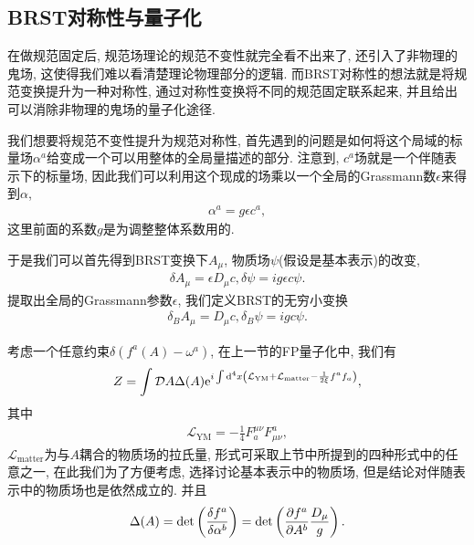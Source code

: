 \subsection{BRST对称性与量子化}
在做规范固定后, 规范场理论的规范不变性就完全看不出来了, 还引入了非物理的鬼场, 这使得我们难以看清楚理论物理部分的逻辑. 而BRST对称性的想法就是将规范变换提升为一种对称性, 通过对称性变换将不同的规范固定联系起来, 并且给出可以消除非物理的鬼场的量子化途径.

我们想要将规范不变性提升为规范对称性, 首先遇到的问题是如何将这个局域的标量场$\alpha^a$给变成一个可以用整体的全局量描述的部分. 注意到, $c^a$场就是一个伴随表示下的标量场, 因此我们可以利用这个现成的场乘以一个全局的Grassmann数$\epsilon$来得到$\alpha$, 
\begin{align}
    \alpha^a=g\epsilon c^a,
\end{align}
这里前面的系数$g$是为调整整体系数用的.

于是我们可以首先得到BRST变换下$A_\mu$, 物质场$\psi$(假设是基本表示)的改变,
\begin{align}
    \delta A_\mu=\epsilon D_\mu c, \delta\psi=ig\epsilon c\psi.
\end{align}
提取出全局的Grassmann参数$\epsilon$, 我们定义BRST的无穷小变换
\begin{align}
    \delta_B A_\mu=D_\mu c, \delta_B\psi=ig c\psi.
\end{align}

考虑一个任意约束$\delta(f^a(A)-\omega^a)$, 在上一节的FP量子化中, 我们有
\begin{align}
    Z=\int\mathcal DA\Delta(A)\mathrm e^{i\int\mathrm d^4x\left(\mathcal L_{\mathrm{YM}}+\mathcal L_{\mathrm{matter}}-\frac1{2\xi}f^af_a\right)},
\end{align}
其中
\begin{align}
    \mathcal L_{\mathrm{YM}}=-\frac14F^{\mu\nu}_aF_{\mu\nu}^a, 
\end{align}
$\mathcal L_{\mathrm{matter}}$为与$A$耦合的物质场的拉氏量, 形式可采取上节中所提到的四种形式中的任意之一, 在此我们为了方便考虑, 选择讨论基本表示中的物质场, 但是结论对伴随表示中的物质场也是依然成立的. 并且
\begin{align}
    \Delta(A)=\det\left(\frac{\delta f^a}{\delta\alpha^b}\right)=\det\left(\frac{\partial f^a}{\partial A^b}\frac{D_\mu}{g}\right).
\end{align}

